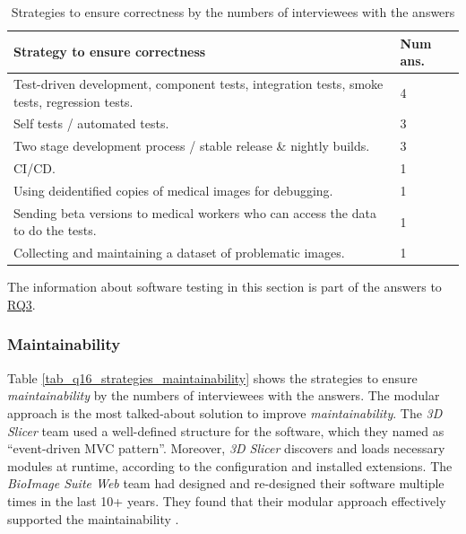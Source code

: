 \documentclass[preprint,12pt,authoryear]{elsarticle}
\begin{document}
\begin{table}[ht]
\centering
\hspace*{-1.5cm}\begin{tabular}{ll}
\hline
Strategy to ensure correctness & Num ans. \\ \hline
Test-driven development, component tests, integration tests, smoke tests, regression tests. & 4 \\
Self tests / automated tests. & 3 \\
Two stage development process / stable release \& nightly builds. & 3 \\
CI/CD. & 1 \\
Using deidentified copies of medical images for debugging. & 1 \\
Sending beta versions to medical workers who can access the data to do the tests. & 1 \\
Collecting and maintaining a dataset of problematic images. & 1 \\ \hline
\end{tabular}
\caption{\label{tab_q15_strategies_correctness}Strategies to ensure correctness
by the numbers of interviewees with the answers}
\end{table}

The information about software testing in this section is part of the answers to
\hyperlink{rq3}{RQ3}.

\subsubsection{Maintainability} \label{sec_interview_maintainability}


Table \ref{tab_q16_strategies_maintainability} shows the strategies to ensure
\textit{maintainability} by the numbers of interviewees with the answers. The
modular approach is the most talked-about solution to improve
\textit{maintainability}. The \textit{3D Slicer} team used a well-defined
structure for the software, which they named as ``event-driven MVC pattern''.
Moreover, \textit{3D Slicer} discovers and loads necessary modules at runtime,
according to the configuration and installed extensions. The \textit{BioImage
Suite Web} team had designed and re-designed their software multiple times in
the last 10+ years. They found that their modular approach effectively supported
the maintainability \citep{Joshi2011}. 
\end{document}
